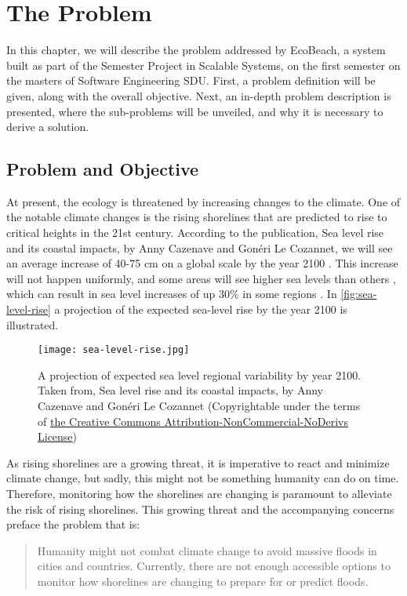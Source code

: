 \chapter{The Problem} \label{ch:the-problem}

In this chapter, we will describe the problem addressed by EcoBeach, a system built as part of the Semester Project in Scalable Systems, on the first semester on the masters of Software Engineering SDU. \medbreak
\noindent
First, a problem definition will be given, along with the overall objective. Next, an in-depth problem description is presented, where the sub-problems will be unveiled, and why it is necessary to derive a solution.

\section{Problem and Objective}

At present, the ecology is threatened by increasing changes to the climate. One of the notable climate changes is the rising shorelines that are predicted to rise to critical heights in the 21st century. According to the publication, Sea level rise and its coastal impacts, by Anny Cazenave and Gonéri Le Cozannet, we will see an average increase of 40-75 cm on a global scale by the year 2100 \cite[p.~23]{sea-level-rise}. This increase will not happen uniformly, and some areas will see higher sea levels than others \cite[p.~21]{sea-level-rise}, which can result in sea level increases of up 30\% in some regions \cite[p.~23]{sea-level-rise}. In \autoref{fig:sea-level-rise} a projection of the expected sea-level rise by the year 2100 is illustrated.

\begin{figure}[h]
    \centering
    \texttt{[image: sea-level-rise.jpg]}
    \caption{A projection of expected sea level regional variability by year 2100. Taken from, Sea level rise and its coastal impacts, by Anny Cazenave and Gonéri Le Cozannet \cite[p.~27]{sea-level-rise} (Copyrightable under the terms of \href{https://creativecommons.org/licenses/by-nc-nd/3.0/}{the Creative Commons Attribution-NonCommercial-NoDerivs License})}
    \label{fig:sea-level-rise}
\end{figure}

As rising shorelines are a growing threat, it is imperative to react and minimize climate change, but sadly, this might not be something humanity can do on time. Therefore, monitoring how the shorelines are changing is paramount to alleviate the risk of rising shorelines. This growing threat and the accompanying concerns preface the problem that is: \medbreak 
\noindent
\begin{quote}
    Humanity might not combat climate change to avoid massive floods in cities and countries. Currently, there are not enough accessible options to monitor how shorelines are changing to prepare for or predict floods. \medbreak 
\end{quote}

